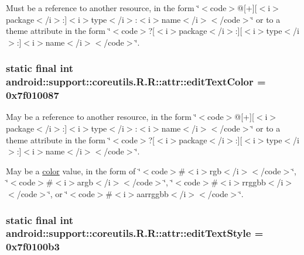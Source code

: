 Must be a reference to another resource, in the form \char`\"{}$<$code$>$@\mbox{[}+\mbox{]}\mbox{[}$<$i$>$package$<$/i$>$:\mbox{]}$<$i$>$type$<$/i$>$:$<$i$>$name$<$/i$>$$<$/code$>$\char`\"{} or to a theme attribute in the form \char`\"{}$<$code$>$?\mbox{[}$<$i$>$package$<$/i$>$:\mbox{]}\mbox{[}$<$i$>$type$<$/i$>$:\mbox{]}$<$i$>$name$<$/i$>$$<$/code$>$\char`\"{}. \hypertarget{classandroid_1_1support_1_1coreutils_1_1_r_1_1attr_5edb9ad9891164f8f9b3f457b80d8198}{
\subsubsection[{editTextColor}]{\setlength{\rightskip}{0pt plus 5cm}static final int android::support::coreutils.R.R::attr::editTextColor = 0x7f010087}}
\label{classandroid_1_1support_1_1coreutils_1_1_r_1_1attr_5edb9ad9891164f8f9b3f457b80d8198}


May be a reference to another resource, in the form \char`\"{}$<$code$>$@\mbox{[}+\mbox{]}\mbox{[}$<$i$>$package$<$/i$>$:\mbox{]}$<$i$>$type$<$/i$>$:$<$i$>$name$<$/i$>$$<$/code$>$\char`\"{} or to a theme attribute in the form \char`\"{}$<$code$>$?\mbox{[}$<$i$>$package$<$/i$>$:\mbox{]}\mbox{[}$<$i$>$type$<$/i$>$:\mbox{]}$<$i$>$name$<$/i$>$$<$/code$>$\char`\"{}. 

May be a \hyperlink{classandroid_1_1support_1_1coreutils_1_1_r_1_1color}{color} value, in the form of \char`\"{}$<$code$>$\#$<$i$>$rgb$<$/i$>$$<$/code$>$\char`\"{}, \char`\"{}$<$code$>$\#$<$i$>$argb$<$/i$>$$<$/code$>$\char`\"{}, \char`\"{}$<$code$>$\#$<$i$>$rrggbb$<$/i$>$$<$/code$>$\char`\"{}, or \char`\"{}$<$code$>$\#$<$i$>$aarrggbb$<$/i$>$$<$/code$>$\char`\"{}. \hypertarget{classandroid_1_1support_1_1coreutils_1_1_r_1_1attr_b8ce610e921c44d0aa5447b7e6b67015}{
\subsubsection[{editTextStyle}]{\setlength{\rightskip}{0pt plus 5cm}static final int android::support::coreutils.R.R::attr::editTextStyle = 0x7f0100b3}}
\label{classandroid_1_1support_1_1coreutils_1_1_r_1_1attr_b8ce610e921c44d0aa5447b7e6b67015}


